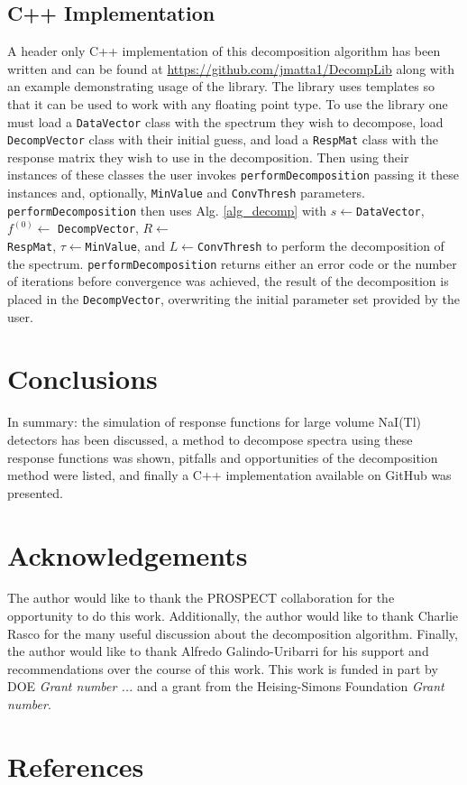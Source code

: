 \documentclass[5p]{elsarticle}
\newcommand{\ic}[1]{\lstinline$#1$}
\begin{document}
\subsection{C++ Implementation}


A header only C++ implementation of this decomposition algorithm has been written and can be found at \url{https://github.com/jmatta1/DecompLib} along with an example demonstrating usage of the library. The library uses templates so that it can be used to work with any floating point type. To use the library one must load a \ic{DataVector} class with the spectrum they wish to decompose, load \ic{DecompVector} class with their initial guess, and load a \ic{RespMat} class with the response matrix they wish to use in the decomposition. Then using their instances of these classes the user invokes \ic{performDecomposition} passing it these instances and, optionally, \ic{MinValue} and \ic{ConvThresh} parameters. \ic{performDecomposition} then uses Alg. \ref{alg_decomp} with $s \gets$\ic{DataVector}, $f^{(0)} \gets$ \ic{DecompVector}, $R \gets$ \\ \ic{RespMat}, $\tau{} \gets$\ic{MinValue}, and $L \gets$\ic{ConvThresh} to perform the decomposition of the spectrum. \ic{performDecomposition} returns either an error code or the number of iterations before convergence was achieved, the result of the decomposition is placed in the \ic{DecompVector}, overwriting the initial parameter set provided by the user.

\section{Conclusions}
In summary: the simulation of response functions for large volume NaI(Tl) detectors has been discussed, a method to decompose spectra using these response functions was shown, pitfalls and opportunities of the decomposition method were listed, and finally a C++ implementation available on GitHub was presented.

\section{Acknowledgements}
The author would like to thank the PROSPECT collaboration for the opportunity to do this work. Additionally, the author would like to thank Charlie Rasco for the many useful discussion about the decomposition algorithm. Finally, the author would like to thank Alfredo Galindo-Uribarri for his support and recommendations over the course of this work. This work is funded in part by DOE \emph{Grant number ...} and a grant from the Heising-Simons Foundation \emph{Grant number}.

\section*{References}



\end{document}
